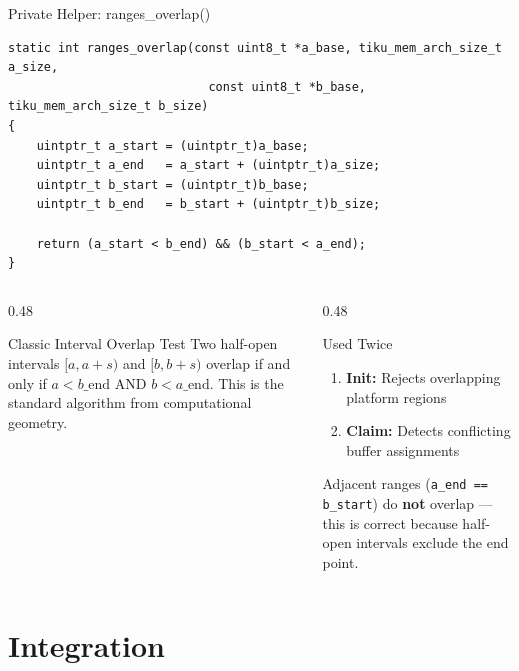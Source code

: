 \documentclass[aspectratio=169, 10pt]{beamer}
\begin{document}
\begin{frame}[fragile]{Private Helper: ranges\_overlap()}
\begin{lstlisting}[style=cstyle, title={kernel/memory/tiku\_region.c}]
static int ranges_overlap(const uint8_t *a_base, tiku_mem_arch_size_t a_size,
                            const uint8_t *b_base, tiku_mem_arch_size_t b_size)
{
    uintptr_t a_start = (uintptr_t)a_base;
    uintptr_t a_end   = a_start + (uintptr_t)a_size;
    uintptr_t b_start = (uintptr_t)b_base;
    uintptr_t b_end   = b_start + (uintptr_t)b_size;

    return (a_start < b_end) && (b_start < a_end);
}
\end{lstlisting}

\vspace{0.5em}
\begin{columns}[T]
\begin{column}{0.48\textwidth}
\begin{block}{Classic Interval Overlap Test}
Two half-open intervals $[a, a{+}s)$ and $[b, b{+}s)$ overlap
if and only if $a < b\_\text{end}$ AND $b < a\_\text{end}$.
This is the standard algorithm from computational geometry.
\end{block}
\end{column}
\begin{column}{0.48\textwidth}
\begin{block}{Used Twice}
\begin{enumerate}
  \item \textbf{Init:} Rejects overlapping platform regions
  \item \textbf{Claim:} Detects conflicting buffer assignments
\end{enumerate}
Adjacent ranges (\texttt{a\_end == b\_start}) do \textbf{not}
overlap --- this is correct because half-open intervals exclude
the end point.
\end{block}
\end{column}
\end{columns}
\end{frame}

\section{Integration}
\end{document}
